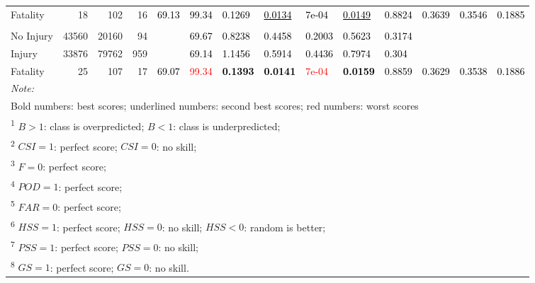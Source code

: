 \documentclass[]{elsarticle} %
\begin{document}
\begin{table}
{{\begin{tabular}[t]{lrrrllllllllll}
Fatality & 18 & 102 & 16 & \multirow{-3}{*}{\raggedright\arraybackslash \textcolor{black}{69.13}} & \textcolor{black}{99.34} & \textcolor{black}{0.1269} & \textcolor{black}{\underline{0.0134}} & \textcolor{black}{7e-04} & \textcolor{black}{\underline{0.0149}} & \textcolor{black}{0.8824} & \multirow{-3}{*}{\raggedright\arraybackslash \textcolor{black}{0.3639}} & \multirow{-3}{*}{\raggedright\arraybackslash \textcolor{black}{0.3546}} & \multirow{-3}{*}{\raggedright\arraybackslash \textcolor{black}{0.1885}}\\
\cmidrule{1-14}
\addlinespace[0.3em]
\multicolumn{14}{l}{\textbf{Model 4 Ensemble}}\\
\hspace{1em}No Injury & 43560 & 20160 & 94 &  & \textcolor{black}{69.67} & \textcolor{black}{0.8238} & \textcolor{black}{0.4458} & \textcolor{black}{0.2003} & \textcolor{black}{0.5623} & \textcolor{black}{0.3174} &  &  & \\

\hspace{1em}Injury & 33876 & 79762 & 959 &  & \textcolor{black}{69.14} & \textcolor{black}{1.1456} & \textcolor{black}{0.5914} & \textcolor{black}{0.4436} & \textcolor{black}{0.7974} & \textcolor{black}{0.304} &  &  & \\

Fatality & 25 & 107 & 17 & \multirow{-3}{*}{\raggedright\arraybackslash \textcolor{black}{69.07}} & \textcolor{red}{99.34} & \textcolor{black}{\textbf{0.1393}} & \textcolor{black}{\textbf{0.0141}} & \textcolor{red}{7e-04} & \textcolor{black}{\textbf{0.0159}} & \textcolor{black}{0.8859} & \multirow{-3}{*}{\raggedright\arraybackslash \textcolor{black}{0.3629}} & \multirow{-3}{*}{\raggedright\arraybackslash \textcolor{black}{0.3538}} & \multirow{-3}{*}{\raggedright\arraybackslash \textcolor{black}{0.1886}}\\
\bottomrule
\multicolumn{14}{l}{\textit{Note: }}\\
\multicolumn{14}{l}{Bold numbers: best scores; underlined numbers: second best scores; red numbers: worst scores}\\
\multicolumn{14}{l}{\textsuperscript{1} $B>1$: class is overpredicted; $B<1$: class is underpredicted; }\\
\multicolumn{14}{l}{\textsuperscript{2} $CSI = 1$: perfect score; $CSI = 0$: no skill; }\\
\multicolumn{14}{l}{\textsuperscript{3} $F = 0$: perfect score; }\\
\multicolumn{14}{l}{\textsuperscript{4} $POD = 1$: perfect score; }\\
\multicolumn{14}{l}{\textsuperscript{5} $FAR = 0$: perfect score; }\\
\multicolumn{14}{l}{\textsuperscript{6} $HSS = 1$: perfect score; $HSS = 0$: no skill; $HSS < 0$: random is better; }\\
\multicolumn{14}{l}{\textsuperscript{7} $PSS = 1$: perfect score; $PSS = 0$: no skill; }\\
\multicolumn{14}{l}{\textsuperscript{8} $GS = 1$: perfect score; $GS = 0$: no skill.}\\
\end{tabular}}}
\end{table}
\end{document}
